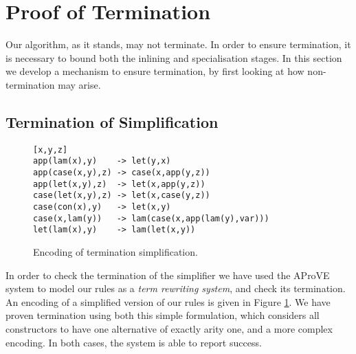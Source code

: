 \section{Proof of Termination}
\label{secF:termination}

\begin{comment}
We can remove all data types by encoding them as functions, as described in \citet{naylor:reduceron}. If we then had a transformation which made the program first-order \textit{without} introducing any data types, we would end up with a program without data or closures, which is incapable of storing an unbounded amount of information. Since with higher-order functions we can implement a Turing machine \cite{turing:halting}, and without an unbounded store we cannot, such a transformation cannot exist.
\end{comment}

Our algorithm, as it stands, may not terminate. In order to ensure termination, it is necessary to bound both the inlining and specialisation stages. In this section we develop a mechanism to ensure termination, by first looking at how non-termination may arise.

\subsection{Termination of Simplification}
\label{secF:termination_simplification}

\begin{figure}
\bigskip
\begin{verbatim}
[x,y,z]
app(lam(x),y)    -> let(y,x)
app(case(x,y),z) -> case(x,app(y,z))
app(let(x,y),z)  -> let(x,app(y,z))
case(let(x,y),z) -> let(x,case(y,z))
case(con(x),y)   -> let(x,y)
case(x,lam(y))   -> lam(case(x,app(lam(y),var)))
let(lam(x),y)    -> lam(let(x,y))
\end{verbatim}
\bigskip
\caption{Encoding of termination simplification.}
\label{figF:term_simplification}
\end{figure}

In order to check the termination of the simplifier we have used the AProVE system \cite{aprove} to model our rules as a \textit{term rewriting system}, and check its termination. An encoding of a simplified version of our rules is given in Figure \ref{figF:term_simplification}. We have proven termination using both this simple formulation, which considers all constructors to have one alternative of exactly arity one, and a more complex encoding. In both cases, the system is able to report success.

